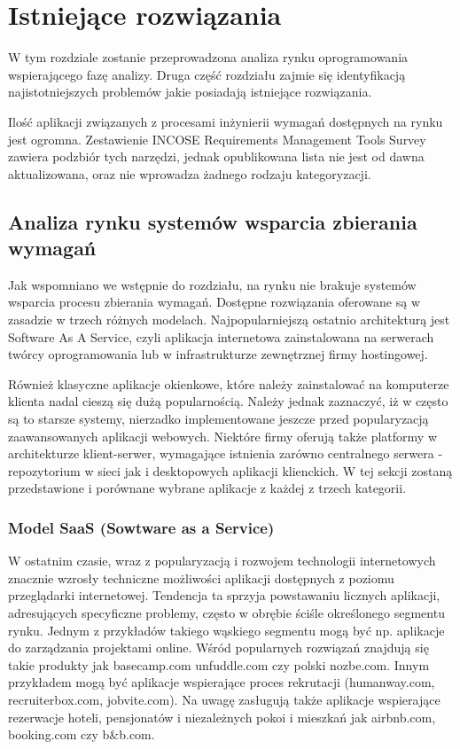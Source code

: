 \chapter{Istniejące rozwiązania}


  W tym rozdziale zostanie przeprowadzona analiza rynku oprogramowania wspierającego fazę analizy. Druga część rozdziału zajmie się identyfikacją najistotniejszych problemów jakie posiadają istniejące rozwiązania. 

  Ilość aplikacji związanych z procesami inżynierii wymagań dostępnych na rynku jest ogromna. Zestawienie INCOSE Requirements Management Tools Survey \cite{Incose} zawiera podzbiór tych narzędzi, jednak opublikowana lista nie jest od dawna aktualizowana, oraz nie wprowadza żadnego rodzaju kategoryzacji. 

  \section{Analiza rynku systemów wsparcia zbierania wymagań}

    Jak wspomniano we wstępnie do rozdziału, na rynku nie brakuje systemów wsparcia procesu zbierania wymagań. Dostępne rozwiązania oferowane są w zasadzie w trzech różnych modelach. Najpopularniejszą ostatnio architekturą jest Software As A Service, czyli aplikacja internetowa zainstalowana na serwerach twórcy oprogramowania lub w infrastrukturze zewnętrznej firmy hostingowej. 
    
    Również klasyczne aplikacje okienkowe, które należy zainstalować na komputerze klienta nadal cieszą się dużą popularnością. Należy jednak zaznaczyć, iż w często są to starsze systemy, nierzadko implementowane jeszcze przed popularyzacją zaawansowanych aplikacji webowych. Niektóre firmy oferują także platformy w architekturze klient-serwer, wymagające istnienia zarówno centralnego serwera - repozytorium w sieci jak i desktopowych aplikacji klienckich. W tej sekcji zostaną przedstawione i porównane wybrane aplikacje z każdej z trzech kategorii. 

    \subsection{Model SaaS (Sowtware as a Service)}

      W ostatnim czasie, wraz z popularyzacją i rozwojem technologii internetowych znacznie wzrosły techniczne możliwości aplikacji dostępnych z poziomu przeglądarki internetowej. Tendencja ta sprzyja powstawaniu licznych aplikacji, adresujących specyficzne problemy, często w obrębie ściśle określonego segmentu rynku. Jednym z przykładów takiego wąskiego segmentu mogą być np. aplikacje do zarządzania projektami online. Wśród popularnych rozwiązań znajdują się takie produkty jak basecamp.com unfuddle.com czy polski nozbe.com. Innym przykładem mogą być aplikacje wspierające proces rekrutacji (humanway.com, recruiterbox.com, jobvite.com). Na uwagę zasługują także aplikacje wspierające rezerwacje hoteli, pensjonatów i niezależnych pokoi i mieszkań jak airbnb.com, booking.com czy b\&b.com. 

